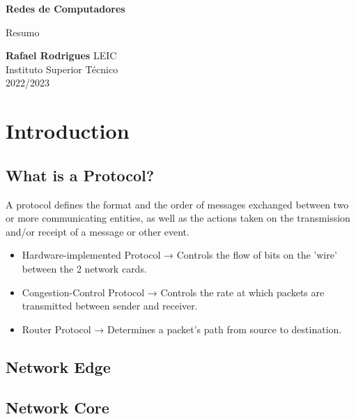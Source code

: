 \documentclass[12pt]{article}
\begin{document}
\begin{titlepage}
    \begin{center}
        \vspace*{1cm}

        \textbf{Redes de Computadores}
        \vspace{0.5cm}

        Resumo
        \vspace{1.5cm}

        \textbf{Rafael Rodrigues}
        \vfill
        LEIC \\
        Instituto Superior Técnico \\
        2022/2023
    \end{center}
\end{titlepage}

\tableofcontents

\newpage

\section{Introduction}

\subsection{What is a Protocol?}
A protocol defines the format and the order of messages exchanged between two or more communicating entities, as
well as the actions taken on the transmission and/or receipt of a message or other event.
\begin{itemize}
    \item Hardware-implemented Protocol → Controls the flow of bits on the 'wire' between the 2 network cards.
    \item Congestion-Control Protocol → Controls the rate at which packets are transmitted between sender and receiver.
    \item Router Protocol → Determines a packet's path from source to destination.
\end{itemize}

\subsection{Network Edge}

\subsection{Network Core}
\end{document}
